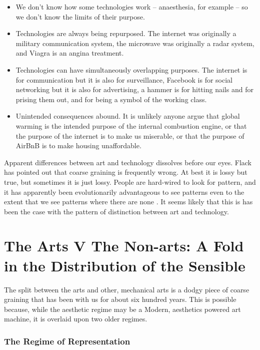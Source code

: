 \documentclass[letterpaper]{article}
\begin{document}
    \begin{itemize}
     
        \item We don't know how some technologies work – anaesthesia, for example – so we don't know the limits of their purpose.
    
        \item Technologies are always being repurposed. The internet was originally a military communication system, the microwave was originally a radar system, and Viagra is an angina treatment.

        \item Technologies can have simultaneously overlapping purposes. The internet is for communication but it is also for surveillance, Facebook is for social networking but it is also for advertising, a hammer is for hitting nails and for prising them out, and for being a symbol of the working class.

        \item Unintended consequences abound. It is unlikely anyone argue that global warming is the intended purpose of the internal combustion engine, or that the purpose of the internet is to make us miserable, or that the purpose of AirBnB is to make housing unaffordable.
    \end{itemize}

    Apparent differences between art and technology dissolves before our eyes. Flack has pointed out that coarse graining is frequently wrong. At best it is lossy but true, but sometimes it is just lossy. People are hard-wired to look for pattern, and it has apparently been evolutionarily advantageous to see patterns even to the extent that we see patterns where there are none \citep{FristonThFrEnrgPrncpl2010}. It seems likely that this is has been the case with the pattern of distinction between art and technology.

\section{The Arts V The Non-arts: A Fold in the Distribution of the Sensible}
    
    The split between the arts and other, mechanical arts is a dodgy piece of coarse graining that has been with us for about six hundred years. This is possible because, while the aesthetic regime may be a Modern, aesthetics powered art machine, it is overlaid upon two older regimes. 
    
    \subsubsection{The Regime of Representation}
\end{document}
